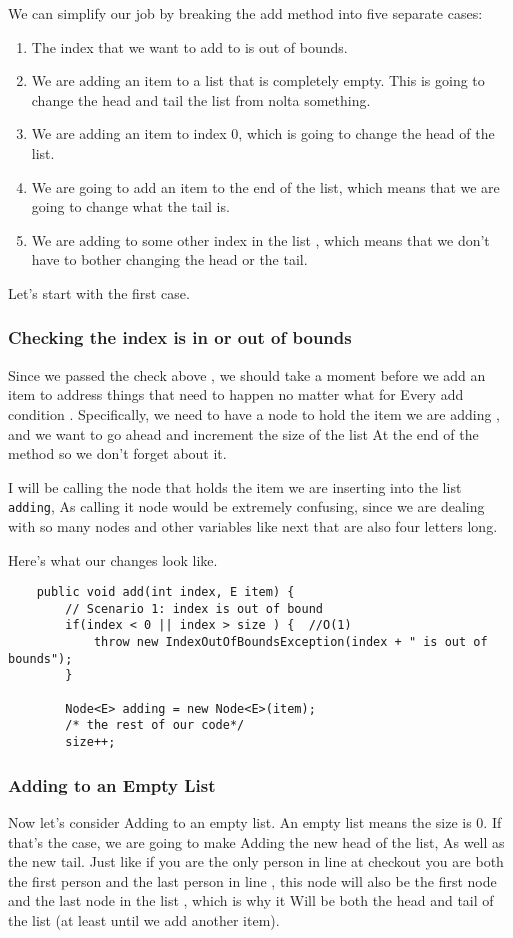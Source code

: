 We can simplify our job by breaking the add method into five separate cases:
\begin{enumerate}
	\item The index that we want to add to is out of bounds.
	\item We are adding an item to a list that is completely empty. This is going to change the head and tail the list from nolta something. 
	\item We are adding an item to index 0, which is going to change the head of the list.
	\item We are going to add an item to the end of the list, which means that we are going to change what the tail is.
	\item We are adding to some other index in the list , which means that we don't have to bother changing the head or the tail.
\end{enumerate}


Let's start with the first case.

\subsubsection{Checking the index is in or out of bounds}




Since we passed the check above , we should take a moment before we add an item to address things that need to happen no matter what for Every add condition . Specifically, we need to have a node to hold the item we are adding , and we want to go ahead and increment the size of the list At the end of the method so we don't forget about it.

I will be calling the node that holds the item we are inserting into the list \texttt{adding}, As calling it node would be extremely confusing, since we are dealing with so many nodes and other variables like next that are also four letters long.

Here's what our changes look like.

\begin{verbatim}
	public void add(int index, E item) {
		// Scenario 1: index is out of bound
		if(index < 0 || index > size ) {  //O(1)
			throw new IndexOutOfBoundsException(index + " is out of bounds");
		}
		
		Node<E> adding = new Node<E>(item);
		/* the rest of our code*/
		size++;
	\end{verbatim}
	
	
	
	\subsubsection{Adding to an Empty List}
	Now let's consider Adding to an empty list.  An empty list means the size is 0.  If that's the case, we are going to make Adding the new head of the list, As well as the new tail.  Just like if you are the only person in line at checkout you are both the first person and the last person in line , this node will also be the first node and the last node in the list , which is why it Will be both the head and tail of the list (at least until we add another item).
	
